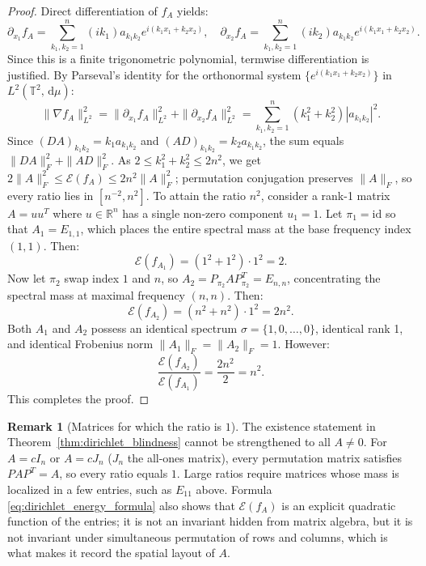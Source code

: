 \documentclass[11pt,a4paper,reqno]{amsart}
\theoremstyle{definition}
\newtheorem{remark}[theorem]{Remark}
\numberwithin{equation}{section}
\newcommand{\R}{\mathbb{R}}
\newcommand{\Tor}{\mathbb{T}}
\newcommand{\dif}{\,\mathrm{d}}
\begin{document}
\begin{proof}
Direct differentiation of $f_A$ yields:
\begin{equation}
    \partial_{x_1} f_A = \sum_{k_1, k_2=1}^n (i k_1) a_{k_1 k_2} e^{i(k_1 x_1 + k_2 x_2)}, \quad
    \partial_{x_2} f_A = \sum_{k_1, k_2=1}^n (i k_2) a_{k_1 k_2} e^{i(k_1 x_1 + k_2 x_2)}.
\end{equation}
Since this is a finite trigonometric polynomial, termwise differentiation is justified. By Parseval's identity for the orthonormal system $\{e^{i(k_1 x_1 + k_2 x_2)}\}$ in $L^2(\Tor^2, \dif\mu)$:
\begin{equation}
    \|\nabla f_A\|_{L^2}^2 = \|\partial_{x_1} f_A\|_{L^2}^2 + \|\partial_{x_2} f_A\|_{L^2}^2 = \sum_{k_1, k_2=1}^n (k_1^2 + k_2^2) |a_{k_1 k_2}|^2.
\end{equation}
Since $(DA)_{k_1 k_2} = k_1 a_{k_1 k_2}$ and $(AD)_{k_1 k_2} = k_2 a_{k_1 k_2}$, the sum equals $\|DA\|_F^2 + \|AD\|_F^2$. As $2 \le k_1^2 + k_2^2 \le 2n^2$, we get $2\|A\|_F^2 \le \mathcal{E}(f_A) \le 2n^2 \|A\|_F^2$; permutation conjugation preserves $\|A\|_F$, so every ratio lies in $[n^{-2}, n^2]$.
To attain the ratio $n^2$, consider a rank-1 matrix $A = u u^T$ where $u \in \R^n$ has a single non-zero component $u_1 = 1$. Let $\pi_1 = \mathrm{id}$ so that $A_1 = E_{1,1}$, which places the entire spectral mass at the base frequency index $(1, 1)$. Then:
\begin{equation}
    \mathcal{E}(f_{A_1}) = (1^2 + 1^2) \cdot 1^2 = 2.
\end{equation}
Now let $\pi_2$ swap index $1$ and $n$, so $A_2 = P_{\pi_2} A P_{\pi_2}^T = E_{n, n}$, concentrating the spectral mass at maximal frequency $(n, n)$. Then:
\begin{equation}
    \mathcal{E}(f_{A_2}) = (n^2 + n^2) \cdot 1^2 = 2n^2.
\end{equation}
Both $A_1$ and $A_2$ possess an identical spectrum $\sigma = \{1, 0, \dots, 0\}$, identical rank 1, and identical Frobenius norm $\|A_1\|_F = \|A_2\|_F = 1$. However:
\begin{equation}
    \frac{\mathcal{E}(f_{A_2})}{\mathcal{E}(f_{A_1})} = \frac{2n^2}{2} = n^2.
\end{equation}
This completes the proof.
\end{proof}

\begin{remark}[Matrices for which the ratio is $1$]
The existence statement in Theorem~\ref{thm:dirichlet_blindness} cannot be strengthened to all $A \neq 0$. For $A = c I_n$ or $A = c J_n$ ($J_n$ the all-ones matrix), every permutation matrix satisfies $P A P^T = A$, so every ratio equals $1$. Large ratios require matrices whose mass is localized in a few entries, such as $E_{11}$ above. Formula \eqref{eq:dirichlet_energy_formula} also shows that $\mathcal{E}(f_A)$ is an explicit quadratic function of the entries; it is not an invariant hidden from matrix algebra, but it is not invariant under simultaneous permutation of rows and columns, which is what makes it record the spatial layout of $A$.
\end{remark}
\end{document}
